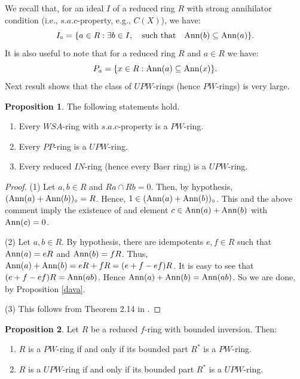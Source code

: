 \documentclass{amsart}
\theoremstyle{definition}
\theoremstyle{remark}
\numberwithin{equation}{section}
\newcommand{\Ann}{{\rm Ann}}
\theoremstyle{definition}\newtheorem{thm}{Theorem}[section]
\theoremstyle{definition}\newtheorem{cor}[thm]{Corollary}
\theoremstyle{definition}\newtheorem{lem}[thm]{Lemma}
\theoremstyle{definition}\newtheorem{prop}[thm]{Proposition}
\theoremstyle{definition}\newtheorem{defn}[thm]{Definition}
\theoremstyle{definition}\newtheorem{Rem}[thm]{Remark}
\theoremstyle{remark}\newtheorem{rem}[thm]{Remark}
\theoremstyle{definition}\newtheorem{exam}[thm]{Example}
\theoremstyle{definition}\newtheorem{qu}[thm]{question}
\begin{document}
We recall that, for an ideal $I$ of  a reduced ring $R$ with strong annihilator condition (i.e., $s.a.c$-property, e.g., $C(X)$), we have: \[I_{\circ}=\{a\in R: \exists b\in I,\quad\text{such that}\quad \Ann(b)\subseteq\Ann(a)\}.\] It is also useful to note that for a reduced ring $R$ and $a\in R$ we have: \[P_a=\{x\in R: \Ann(a)\subseteq\Ann(x)\}.\] Next result shows that the class of $UPW$-rings (hence $PW$-rings) is very large.
\begin{prop}
The following statements hold.
\begin{enumerate}
\item Every  $WSA$-ring with $s.a.c$-property  is a $PW$-ring. 

\item Every $PP$-ring is a $UPW$-ring.

\item Every reduced $IN$-ring (hence every  Baer ring) is a $UPW$-ring.

\end{enumerate}
\end{prop}
\begin{proof}
(1) Let $a, b\in R$ and  $Ra\cap Rb=0$. Then, by hypothesis, $(\Ann(a) +\Ann(b))_{\circ}=R$. Hence, $1\in (\Ann(a)+\Ann(b))_{\circ}$. This and the above comment imply the existence of and element $c\in\Ann(a)+ \Ann(b)$ with $\Ann(c)=0$. 

(2) Let $a, b\in R$. By hypothesis, there are idempotents $e, f\in R$ such that $\Ann(a)=eR$ and $\Ann(b)=fR$. Thus, $\Ann(a)+\Ann(b)= eR+ fR=(e+f-ef)R$. It is easy to see that $(e+f-ef)R=\Ann(ab)$. Hence $\Ann(a)+\Ann(b)=\Ann(ab)$. So we are done, by Proposition \ref{dava}.

(3) This follows from Theorem 2.14 in \cite{AlTaTa}.
\end{proof}
\begin{prop}\label{Du}
Let $R$ be a reduced $f$-ring with bounded inversion. Then:
\begin{enumerate}
\item $R$ is a $PW$-ring if and only if its bounded part $R^*$ is a $PW$-ring.
\item $R$ is a $UPW$-ring if and only if its bounded part $R^*$ is a $UPW$-ring.
\end{enumerate}
\end{prop}
\end{document}
